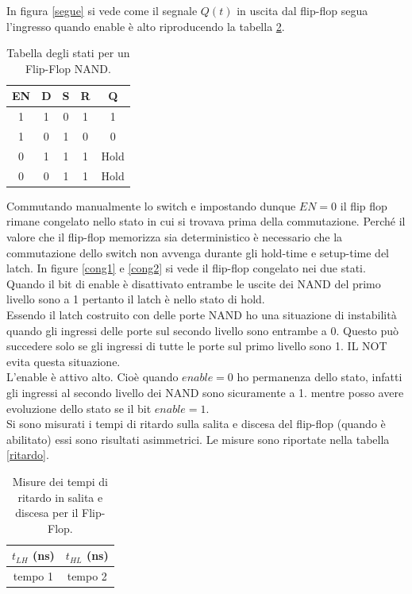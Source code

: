 \documentclass[10pt,a4paper]{article}
\begin{document}
In figura \ref{segue} si vede come il segnale $Q(t)$ in uscita dal flip-flop segua l'ingresso quando enable è alto riproducendo la tabella \ref{stati2}.\\

\begin{table}[!htb]
\centering
\begin{tabular}{|c|c|c|c|c|}
\hline 
EN & D & S & R & Q\\ 
\hline 
1 & 1 & 0 & 1 & 1\\ 
\hline 
1 & 0 & 1 & 0 & 0\\ 
\hline 
0 & 1 & 1 & 1 & Hold\\ 
\hline 
0 & 0 & 1 & 1 & Hold\\ 
\hline 
\end{tabular}
\caption{Tabella degli stati per un Flip-Flop NAND. \label{stati2}}
\end{table}


Commutando manualmente lo switch e impostando dunque $EN = 0$ il flip flop rimane congelato nello stato in cui si trovava prima della commutazione.
Perché il valore che il flip-flop memorizza sia deterministico è necessario che la commutazione dello switch non avvenga durante gli hold-time e setup-time del latch. In figure \ref{cong1} e \ref{cong2} si vede il flip-flop congelato nei due stati. Quando il bit di enable è disattivato entrambe le uscite dei NAND del primo livello sono a 1 pertanto il latch è nello stato di hold.\\

Essendo il latch costruito con delle porte NAND ho una situazione di instabilità quando gli ingressi delle porte sul secondo livello sono entrambe a 0. Questo può succedere solo se gli ingressi di tutte le porte sul primo livello sono 1. IL NOT evita questa situazione.\\
L'enable è attivo alto. Cioè quando $enable = 0$ ho permanenza dello stato, infatti gli ingressi al secondo livello dei NAND sono sicuramente a 1. mentre posso avere evoluzione dello stato se il bit $enable = 1$.\\

Si sono misurati i tempi di ritardo sulla salita e discesa del flip-flop (quando è abilitato) essi sono risultati asimmetrici. Le misure sono riportate nella tabella \ref{ritardo}.

\begin{table}[!htb]
\centering
\begin{tabular}{|c|c|}
\hline 
$t_{LH}$ (ns) & $t_{HL}$ (ns)\\
\hline
tempo 1 & tempo 2\\
\hline
\end{tabular}
\caption{Misure dei tempi di ritardo in salita e discesa per il Flip-Flop. \label{stati2}}
\end{table}
\end{document}
